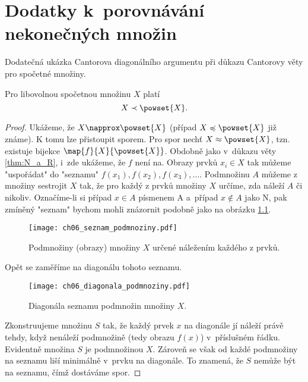 \chapter{Dodatky k~porovnávání nekonečných množin}\label{chap:dodatky_k_porovnavani_nekonecnych_mn}
Dodatečná ukázka Cantorova diagonálního argumentu při důkazu Cantorovy věty pro spočetné množiny.
\begin{theorem}\label{thm:cantorova_veta_spocetne}
    Pro libovolnou spočetnou množinu $X$ platí
    \begin{equation*}
        X\prec\powset{X}.
    \end{equation*}
\end{theorem}
\begin{proof}
    Ukážeme, že $X\napprox\powset{X}$ (případ $X\preccurlyeq\powset{X}$ již známe). K tomu lze přistoupit sporem. Pro spor nechť $X\approx\powset{X}$, tzn. existuje bijekce $\map{f}{X}{\powset{X}}$. Obdobně jako v~důkazu věty \ref{thm:N_a_R}, i~zde ukážeme, že $f$ není na. Obrazy prvků $x_i\in X$ tak můžeme "uspořádat" do "seznamu" $f(x_1),f(x_2),f(x_3),\dots$. Podmnožinu $A$ můžeme z množiny sestrojit $X$ tak, že pro každý z prvků množiny $X$ určíme, zda náleží $A$ či nikoliv. Označíme-li si případ $x\in A$ písmenem A a~případ $x\notin A$ jako N, pak zmíněný "seznam" bychom mohli znázornit podobně jako na obrázku \ref{fig:seznam_podmnoziny}.
    \begin{figure}[H]
        \centering
        \texttt{[image: ch06\_seznam\_podmnoziny.pdf]}
        \caption{Podmnožiny (obrazy) množiny $X$ určené náležením každého z prvků.}
        \label{fig:seznam_podmnoziny}
    \end{figure}
    Opět se zaměříme na diagonálu tohoto seznamu.
    \begin{figure}[H]
        \centering
        \texttt{[image: ch06\_diagonala\_podmnoziny.pdf]}
        \caption{Diagonála seznamu podmnožin množiny $X$.}
        \label{fig:diagonala_podmnoziny}
    \end{figure}
    Zkonstruujeme množinu $S$ tak, že každý prvek $x$ na diagonále jí náleží právě tehdy, když nenáleží podmnožině (tedy obrazu $f(x)$) v~příslušném řádku. Evidentně množina $S$ je podmnožinou $X$. Zároveň se však od každé podmnožiny na seznamu liší minimálně v~prvku na diagonále. To znamená, že $S$ nemůže být na seznamu, čímž dostáváme spor.
\end{proof}
